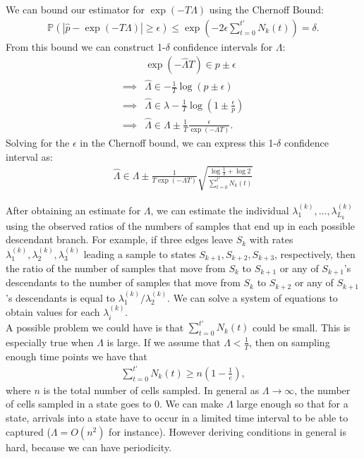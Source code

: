 \documentclass[11pt,onecolumn]{article}
\begin{document}
We can bound our estimator for $\exp(-T\Lambda)$ using the Chernoff Bound:
\begin{align*}
	\mathbb{P} \left( \left| \hat{p} - \exp(-T\Lambda) \right| \geq \epsilon \right)  \leq \exp\left(-2\epsilon \sum_{t=0}^{t'} N_k(t) \right) = \delta.
\end{align*}
From this bound we can construct 1-$\delta$ confidence intervals for $\Lambda$:
\begin{align*}
	& \exp(- \hat{\Lambda} T) \in {p} \pm \epsilon \\
	\implies & \hat{\Lambda} \in -\frac{1}{T} \log ({p} \pm \epsilon) \\
	\implies & \hat{\Lambda} \in \lambda - \frac{1}{T} \log \left( 1 \pm \frac{\epsilon}{p} \right) \\
	\implies & \hat{\Lambda} \in \Lambda \pm \frac{1}{T} \frac{\epsilon}{\exp(-\Lambda T)}.
\end{align*}
Solving for the $\epsilon$ in the Chernoff bound, we can express this 1-$\delta$ confidence interval as:
\begin{align*}
	\hat{\Lambda} \in \Lambda \pm \frac{1}{T\exp(-\Lambda T)} \sqrt{\frac{\log \frac{1}{\delta}+\log 2}{\sum_{t=0}^{t'} N_k(t)}} 
\end{align*}

After obtaining an estimate for $\Lambda$, we can estimate the individual $\lambda_1^{(k)},\dots,\lambda_{L_k}^{(k)}$ using the observed ratios of the numbers of samples that end up in each possible descendant branch. For example, if three edges leave $S_k$ with rates $\lambda_1^{(k)},\lambda_2^{(k)},\lambda_3^{(k)}$ leading a sample to states $S_{k+1},S_{k+2},S_{k+3}$, respectively, then the ratio of the number of samples that move from $S_k$ to $S_{k+1}$ or any of $S_{k+1}$'s descendants to the number of samples that move from $S_k$ to $S_{k+2}$ or any of $S_{k+1}$'s descendants is equal to $\lambda_1^{(k)}/\lambda_2^{(k)}$. We can solve a system of equations to obtain values for each $\lambda_i^{(k)}$. \\

A possible problem we could have is that $\sum_{t=0}^{t'} N_k(t)$ could be small. 
This is especially true when $\Lambda$ is large. If we assume that $\Lambda < \frac{1}{T}$, then on sampling enough time points we have that 
\begin{align*}
\sum_{t=0}^{t'} N_k(t) \ge n (1- \frac{1}{e}),
\end{align*}
where $n$ is the total number of cells sampled. In general as $\Lambda \rightarrow \infty$, the number of cells sampled in a state goes to $0$. We can make $\Lambda$  large enough so that for a state, arrivals into a state have to occur in a limited time interval to be able to captured ($\Lambda= O(n^2)$ for instance). However deriving conditions in general is hard, because we can have periodicity.
\end{document}

